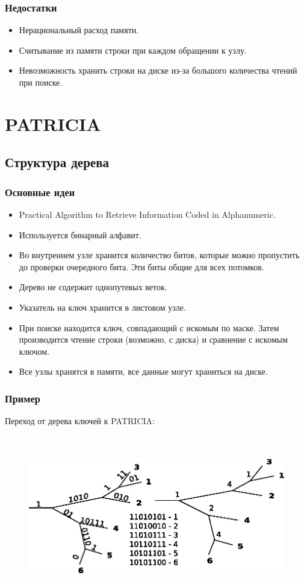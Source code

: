 \documentclass[hyperref={unicode=true}]{beamer}
\begin{document}
\frame
{
  \frametitle{Недостатки}
  \begin{itemize}
    \item Нерациональный расход памяти.
    \item Считывание из памяти строки при каждом обращении к узлу.
    \item Невозможность хранить строки на диске из-за большого количества чтений при поиске.
  \end{itemize}
}

\section{PATRICIA}
\subsection{Структура дерева}
\frame
{
  \frametitle{Основные идеи}
  \begin{itemize}
    \item Practical Algorithm to Retrieve Information Coded in
      Alphanumeric. 
    \item Используется бинарный алфавит.
    \item Во внутреннем узле хранится количество битов, которые можно
      пропустить до проверки очередного бита. Эти биты общие для всех
      потомков. 
    \item Дерево не содержит однопутевых веток.
    \item Указатель на ключ хранится в листовом узле.
    \item При поиске находится ключ, совпадающий с искомым по
      маске. Затем производится чтение строки (возможно, с диска) и
      сравнение с искомым ключом. 
    \item Все узлы хранятся в памяти, все данные могут храниться на
      диске. 
  \end{itemize}
}

\frame
{
\frametitle{Пример}
Переход от дерева ключей к PATRICIA:\\
~\\
~\\
\begin{figure}[h!]
\centerline{\includegraphics{pat1.eps}}
\end{figure}
}
\end{document}
